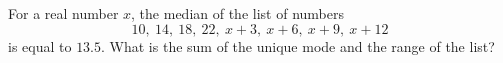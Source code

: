 For a real number $x$, the median of the list of numbers
\[10,\ 14,\ 18,\ 22,\ x+3,\ x+6,\ x+9,\ x+12\]
is equal to $13.5$. What is the sum of the unique mode and the range of the list?
